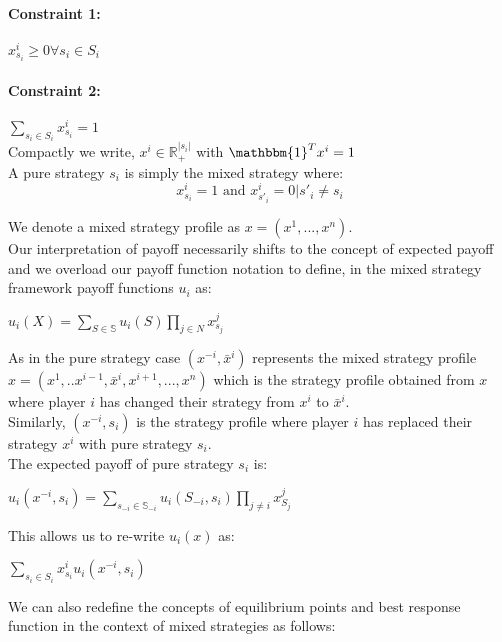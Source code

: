 \documentclass[12pt]{article}
\begin{document}
\paragraph{Constraint 1:} $x^i_{s_i} \geq 0 \forall s_i \in S_i$

\paragraph{Constraint 2:} $\sum\limits_{s_i \in S_i} x^i_{s_i} = 1$\\
Compactly we write, $x^i \in \mathbb{R}^{|s_i|}_+$ with $\mathbbm{1}^T x^i = 1$\\

A pure strategy $s_i$ is simply the mixed strategy where:
\begin{equation*}
	x^i_{s_i} = 1 \text{ and }  x^i_{s'_i} = 0 | s'_i \neq s_i
\end{equation*}

We denote a mixed strategy profile as $x = (x^1, ... , x^n)$.\\ 

Our interpretation of payoff necessarily shifts to the concept of expected payoff and we overload our payoff function notation to define, in the mixed strategy framework payoff functions $u_i$ as:
\begin{center}
$u_i(X) = \sum\limits_{S \in \mathbb{S}} u_i(S)\prod\limits_{j \in N} x^j_{s_j}$\\
\end{center}
As in the pure strategy case $(x^{-i}, \bar{x}^i)$ represents the mixed strategy profile $x = (x^1, .. x^{i-1}, \bar{x}^i, x^{i+1}, ... ,x^n)$ which is the strategy profile obtained from $x$ where player $i$ has changed their strategy from $x^i$ to $\bar{x}^i$.\\

Similarly, $(x^{-i}, s_i)$ is the strategy profile where player $i$ has replaced their strategy $x^i$ with pure strategy $s_i$.\\

\newpage
The expected payoff of pure strategy $s_i$ is:
\begin{center} $u_i(x^{-i},s_i) = \sum\limits_{s_{-i} \in \mathbb{S}_{-i}} u_i(S_{-i}, s_i) \prod\limits_{j \neq i} x^j_{S_j}$\\
\end{center}

This allows us to re-write $u_i(x)$ as:

\begin{center}
$\sum\limits_{s_i \in S_i} x^i_{s_i} u_i(x^{-i},s_i)$
\end{center}
We can also redefine the concepts of equilibrium points and best response function in the context of mixed strategies as follows:
\end{document}
